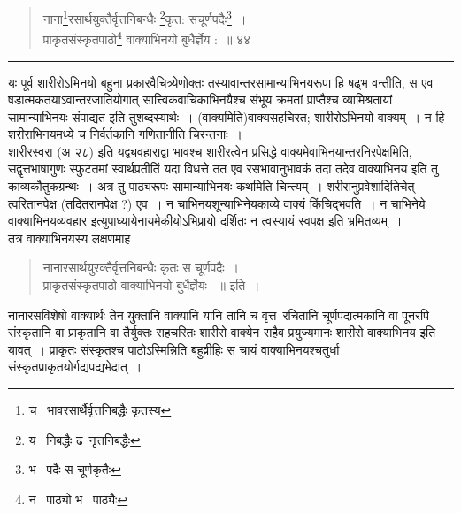 \documentclass[11pt, openany]{book}
\begin{document}
\newpage

\begin{quote}
 {\na नाना\renewcommand{\thefootnote}{1}\footnote{च \textendash\ भावरसार्थैर्वृत्तनिबद्धैः कृतस्य}रसार्थयुक्तैर्वृत्तनिबन्धैः \renewcommand{\thefootnote}{2}\footnote{य \textendash\ निबद्धैः ढ\textendash\ नृत्तनिबद्धैः}कृत: सचूर्णपदैः\renewcommand{\thefootnote}{3}\footnote{भ \textendash\ पदैः स चूर्णकृतैः}~। \\
प्राकृतसंस्कृतपाठो\renewcommand{\thefootnote}{4}\footnote{न \textendash\ पाठ्यो भ \textendash\ पाठ्यैः} वाक्याभिनयो बुधैर्ज्ञेय :~॥ ४४}
\end{quote}

\hrule

\vspace{2mm}

\noindent
यः पूर्व शारीरोऽभिनयो बहुना प्रकारवैचित्र्येणोक्तः तस्यावान्तरसामान्याभिनयरूपा हि षढ्भ वन्तीति, स एव षडात्मकतयाऽवान्तरजातियोगात् सात्त्विकवाचिकाभिनयैश्च संभूय क्रमतां प्राप्तैश्च व्यामिश्रतायां सामान्याभिनयः संपाद्यत इति तुशब्दस्यार्थः~। (वाक्यमिति)वाक्यसहचिरत; शारीरोऽभिनयो वाक्यम्~। न हि शरीराभिनयमध्ये च निर्वर्तकानि गणितानीति चिरन्तनाः~। \\

शारीरस्वरा (अ २८) इति यद्व्यवहाराद्वा भावश्च शारीरत्वेन प्रसिद्धे वाक्यमेवाभिनयान्तरनिरपेक्षमिति, सद्वृत्तभाषागुणः स्फुटतमां स्वार्थप्रतीतिं यदा विधत्ते तत एव रसभावानुभावकं तदा तदेव वाक्याभिनय इति तु काव्यकौतुकग्रन्थः~। अत्र तु पाठ्यरूपः सामान्याभिनयः कथमिति चिन्त्यम्~। शरीरानुप्रवेशादितिचेत् त्वरितानपेक्ष (तदितरानपेक्ष ?) एव~। न चाभिनयशून्याभिनेयकाव्ये वाक्यं किंचिद्भवति~। न चाभिनेये वाक्याभिनयव्यवहार इत्युपाध्यायेनायमेकीयोऽभिप्रायो दर्शितः न त्वस्यायं स्वपक्ष इति भ्रमितव्यम्~। \\

तत्र वाक्याभिनयस्य लक्षणमाह\textendash\ 

\begin{quote}
 {\qt नानारसार्थयुरक्तैर्वृत्तनिबन्धैः कृतः स चूर्णपदैः~। \\
प्राकृतसंस्कृतपाठो वाक्याभिनयो बुर्धैर्ज्ञेयः ~॥ इति~।}\\
\end{quote}
 
नानारसविशेषो वाक्यार्थः तेन युक्तानि वाक्यानि यानि तानि च वृत्त\textendash\ रचितानि चूर्णपदात्मकानि वा पूनरपि संस्कृतानि वा प्राकृतानि वा तैर्युक्तः सहचरितः शारीरो वाक्येन सहैव प्रयुज्यमानः शारीरो वाक्याभिनय इति यावत्~। प्राकृतः संस्कृतश्च पाठोऽस्मिन्निति बहुव्रीहिः स चायं वाक्याभिनयश्चतुर्धा संस्कृतप्राकृतयोर्गद्यपद्यभेदात्~।\\
\end{document}
